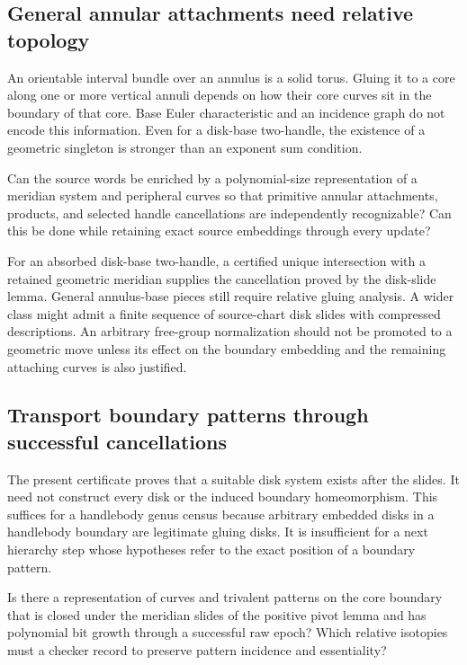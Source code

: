 \subsection{General annular attachments need relative topology}

An orientable interval bundle over an annulus is a solid torus.  Gluing it
to a core along one or more vertical annuli depends on how their core curves
sit in the boundary of that core.  Base Euler characteristic and an incidence
graph do not encode this information.  Even for a disk-base two-handle, the
existence of a geometric singleton is stronger than an exponent sum condition.

\begin{question}
Can the source words be enriched by a polynomial-size representation of a
meridian system and peripheral curves so that primitive annular attachments,
products, and selected handle cancellations are independently recognizable?
Can this be done while retaining exact source embeddings through every update?
\end{question}

For an absorbed disk-base two-handle, a certified unique intersection with
a retained geometric meridian supplies the cancellation proved by the disk-slide
lemma.  General annulus-base pieces still require relative gluing analysis.
A wider class might admit a finite sequence
of source-chart disk slides with compressed descriptions.  An arbitrary free-group
normalization should not be promoted to a geometric move unless its effect on
the boundary embedding and the remaining attaching curves is also justified.

\subsection{Transport boundary patterns through successful cancellations}

The present certificate proves that a suitable disk system exists after the
slides.  It need not construct every disk or the induced boundary
homeomorphism.  This suffices for a handlebody genus census because arbitrary
embedded disks in a handlebody boundary are legitimate gluing disks.  It is
insufficient for a next hierarchy step whose hypotheses refer to the exact
position of a boundary pattern.

\begin{question}
Is there a representation of curves and trivalent patterns on the core boundary
that is closed under the meridian slides of the positive pivot lemma and has
polynomial bit growth through a successful raw epoch?  Which relative isotopies
must a checker record to preserve pattern incidence and essentiality?
\end{question}


